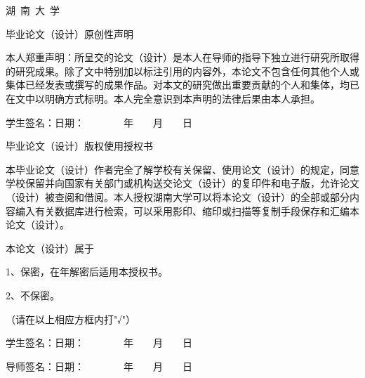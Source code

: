 \thispagestyle{empty}  %

\begin{center}
    {\sizeTwol \heiti 湖~南~大~学}
    
    \vspace{1cm}
    
    {\sizeTwol \heiti 毕业论文（设计）原创性声明}
\end{center}

\vspace{1.5cm}

本人郑重声明：所呈交的论文（设计）是本人在导师的指导下独立进行研究所取得的研究成果。除了文中特别加以标注引用的内容外，本论文不包含任何其他个人或集体已经发表或撰写的成果作品。对本文的研究做出重要贡献的个人和集体，均已在文中以明确方式标明。本人完全意识到本声明的法律后果由本人承担。

\vspace{0.5cm}

学生签名：\hspace{4.5cm}日期：~~~~~~~~年~~~~月~~~~日

\vspace{1cm}

\begin{center}
    {\sizeTwol \heiti 毕业论文（设计）版权使用授权书}
\end{center}

\vspace{1.25cm}

本毕业论文（设计）作者完全了解学校有关保留、使用论文（设计）的规定，同意学校保留并向国家有关部门或机构送交论文（设计）的复印件和电子版，允许论文（设计）被查阅和借阅。本人授权湖南大学可以将本论文（设计）的全部或部分内容编入有关数据库进行检索，可以采用影印、缩印或扫描等复制手段保存和汇编本论文（设计）。

本论文（设计）属于

\hspace{3.3cm}1、保\hspace{1em}密\hspace{0.5em}，在\uline{\makebox[48pt][c]{}}年解密后适用本授权书。

\hspace{3.3cm}2、不保密\hspace{0.5em}。

\hspace{3.3cm}（请在以上相应方框内打"√"）

\vspace{1cm}

学生签名：\hspace{4.5cm}日期：~~~~~~~~年~~~~月~~~~日

导师签名：\hspace{4.5cm}日期：~~~~~~~~年~~~~月~~~~日
